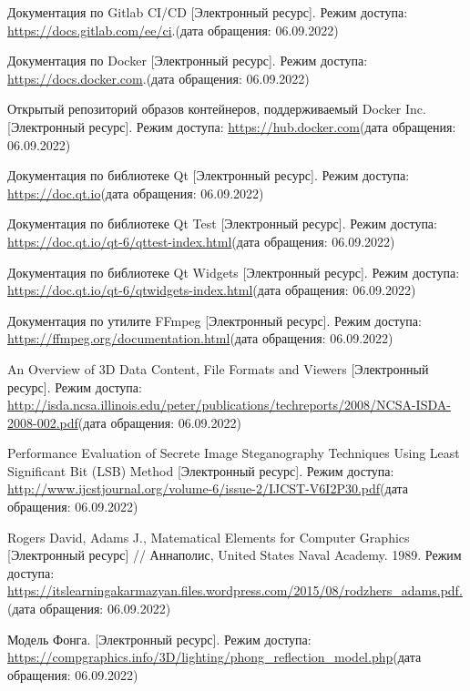 
\begin{thebibliography}{10}
	Документация по Gitlab CI/CD [Электронный ресурс]. Режим доступа: \url{https://docs.gitlab.com/ee/ci}.(дата обращения: 06.09.2022)
	
	Документация по Docker [Электронный ресурс]. Режим доступа: \url{https://docs.docker.com}.(дата обращения: 06.09.2022)
	
	Открытый репозиторий образов контейнеров, поддерживаемый Docker Inc.[Электронный ресурс]. Режим доступа: 
	\url{https://hub.docker.com}(дата обращения: 06.09.2022)
	
	Документация по библиотеке Qt [Электронный ресурс]. Режим доступа:
	\url{https://doc.qt.io}(дата обращения: 06.09.2022)
	
	Документация по библиотеке Qt Test [Электронный ресурс]. Режим доступа:
	\url{https://doc.qt.io/qt-6/qttest-index.html}(дата обращения: 06.09.2022)
	
	Документация по библиотеке Qt Widgets [Электронный ресурс]. Режим доступа:
	\url{https://doc.qt.io/qt-6/qtwidgets-index.html}(дата обращения: 06.09.2022)
	
	Документация по утилите FFmpeg [Электронный ресурс]. Режим доступа:
	\url{https://ffmpeg.org/documentation.html}(дата обращения: 06.09.2022)
	
	 An Overview of 3D Data Content, File Formats and Viewers [Электронный ресурс]. Режим доступа: 
	\url{http://isda.ncsa.illinois.edu/peter/publications/techreports/2008/NCSA-ISDA-2008-002.pdf}(дата обращения: 06.09.2022)

	 Performance Evaluation of Secrete Image Steganography Techniques
	Using Least Significant Bit (LSB) Method [Электронный ресурс]. Режим доступа:
	\url{http://www.ijcstjournal.org/volume-6/issue-2/IJCST-V6I2P30.pdf}(дата обращения: 06.09.2022)
	
	 Rogers David, Adams J., Matematical Elements for Computer Graphics [Электронный ресурс] // Аннаполис, United States Naval Academy. 1989. 
	Режим доступа: \url{https://itslearningakarmazyan.files.wordpress.com/2015/08/rodzhers_adams.pdf.}(дата обращения: 06.09.2022)
	
	 Модель Фонга. [Электронный ресурс]. Режим доступа:
	\url{https://compgraphics.info/3D/lighting/phong_reflection_model.php}(дата обращения: 06.09.2022)
	
			
\end{thebibliography}



